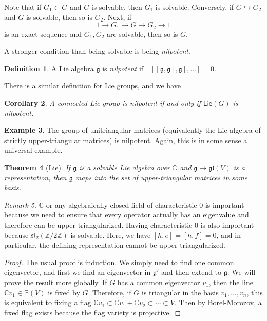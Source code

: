 \documentclass[leqno, openany]{memoir}
\newtheorem{thm}{Theorem}[section]
\newtheorem{cor}[thm]{Corollary}
\theoremstyle{definition}
\newtheorem{defn}[thm]{Definition}
\newtheorem{exm}[thm]{Example}
\theoremstyle{remark}
\newtheorem{rmk}[thm]{Remark}
\theoremstyle{plain}
\theoremstyle{definition}
\theoremstyle{remark}
\newcommand{\C}{\mathbb{C}}
\newcommand{\Z}{\mathbb{Z}}
\renewcommand{\P}{\mathbb{P}}
\newcommand{\mf}[1]{\mathfrak{#1}}
\newcommand{\ms}[1]{\mathsf{#1}}
\begin{document}
Note that if $G_1 \subset G$ and $G$ is solvable, then $G_1$ is solvable.
Conversely, if $G \hookrightarrow G_2$ and $G$ is solvable, then so is $G_2$.
Next, if \[ 1 \to G_1 \to G \to G_2 \to 1 \] is an exact sequence and $G_1,
G_2$ are solvable, then so is $G$.

A stronger condition than being solvable is being \textit{nilpotent}.

\begin{defn} A Lie algebra $\mf{g}$ is \textit{nilpotent} if $[[[\mf{g},
\mf{g}], \mf{g}], \ldots] = 0$.  \end{defn}

There is a similar definition for Lie groups, and we have

\begin{cor} A connected Lie group is \textit{nilpotent} if and only if
$\ms{Lie}(G)$ is nilpotent.  \end{cor}

\begin{exm} The group of unitriangular matrices (equivalently the Lie algebra
of strictly upper-triangular matrices) is nilpotent. Again, this is in some
sense a universal example.  \end{exm}

\begin{thm}[Lie] If $\mf{g}$ is a solvable Lie algebra over $\C$ and $\mf{g}
\to \mf{gl}(V)$ is a representation, then $\mf{g}$ maps into the set of
upper-triangular matrices in some basis.  \end{thm}

\begin{rmk} $\C$ or any algebraically closed field of characteristic $0$ is
    important because we need to ensure that every operator actually has an
    eigenvalue and therefore can be upper-triangularized. Having characteristic
    $0$ is also important because $\mf{sl}_2(\Z/2\Z)$ is solvable. Here, we
    have $[h,e] = [h,f] = 0$, and in particular, the defining representation
    cannot be upper-triangularized.  \end{rmk}

\begin{proof} The usual proof is induction. We simply need to find one common
    eigenvector, and first we find an eigenvector in $\mf{g}'$ and then extend
    to $\mf{g}$. We will prove the result more globally. If $G$ has a common
    eigenvector $v_1$, then the line $\C v_1 \in \P(V)$ is fixed by $G$.
    Therefore, if $G$ is triangular in the basis $v_1, \ldots, v_n$, this is
    equivalent to fixing a flag $\C v_1 \subset \C v_1 + \C v_2 \subset \cdots
    \subset V$. Then by Borel-Morozov, a fixed flag exists because the flag
    variety is projective.  \end{proof}
\end{document}
